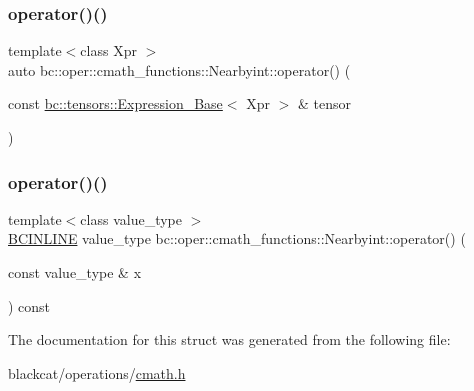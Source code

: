 \mbox{\label{structbc_1_1oper_1_1cmath__functions_1_1Nearbyint_adf240812ef549116a99c9f3811ec42f3}} 
\subsubsection{\texorpdfstring{operator()()}{operator()()}\hspace{0.1cm}{\footnotesize\ttfamily [2/3]}}
{\footnotesize\ttfamily template$<$class Xpr $>$ \\
auto bc\+::oper\+::cmath\+\_\+functions\+::\+Nearbyint\+::operator() (\begin{DoxyParamCaption}\item[{const \hyperlink{classbc_1_1tensors_1_1Expression__Base}{bc\+::tensors\+::\+Expression\+\_\+\+Base}$<$ Xpr $>$ \&}]{tensor }\end{DoxyParamCaption})\hspace{0.3cm}{\ttfamily [inline]}}

\mbox{\label{structbc_1_1oper_1_1cmath__functions_1_1Nearbyint_a4cbeb44a095f0edd07c7abff194ae80f}} 
\subsubsection{\texorpdfstring{operator()()}{operator()()}\hspace{0.1cm}{\footnotesize\ttfamily [3/3]}}
{\footnotesize\ttfamily template$<$class value\+\_\+type $>$ \\
\hyperlink{common_8h_a6699e8b0449da5c0fafb878e59c1d4b1}{B\+C\+I\+N\+L\+I\+NE} value\+\_\+type bc\+::oper\+::cmath\+\_\+functions\+::\+Nearbyint\+::operator() (\begin{DoxyParamCaption}\item[{const value\+\_\+type \&}]{x }\end{DoxyParamCaption}) const\hspace{0.3cm}{\ttfamily [inline]}}



The documentation for this struct was generated from the following file\+:\begin{DoxyCompactItemize}
\item 
blackcat/operations/\hyperlink{cmath_8h}{cmath.\+h}\end{DoxyCompactItemize}
